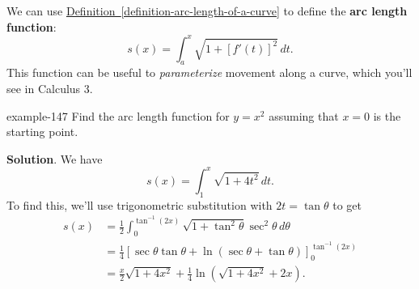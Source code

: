 \documentclass[10pt,]{book}
\newcommand{\terminology}[1]{\textbf{#1}}
\numberwithin{equation}{section}
\newcommand{\amp}{&}
\begin{document}
\par
\hypertarget{p-658}{}%
We can use \hyperref[definition-arc-length-of-a-curve]{Definition~\ref{definition-arc-length-of-a-curve}} to define the \terminology{arc length function}:%
\begin{equation*}
s(x) = \int_{a}^{x}\sqrt{1 + [f'(t)]^{2}}\,dt.
\end{equation*}
This function can be useful to \emph{parameterize} movement along a curve, which you'll see in Calculus 3.%
\begin{example}{}{example-147}%
\hypertarget{p-659}{}%
Find the arc length function for \(y = x^{2}\) assuming that \(x = 0\) is the starting point.%
\par\smallskip%
\noindent\textbf{Solution}.\hypertarget{solution-143}{}\quad%
\hypertarget{p-660}{}%
We have%
\begin{equation*}
s(x) = \int_{1}^{x}\sqrt{1 + 4t^{2}}\,dt.
\end{equation*}
To find this, we'll use trigonometric substitution with \(2t = \tan\theta\) to get%
\begin{align*}
s(x) \amp = \frac{1}{2}\int_{0}^{\tan^{-1}(2x)}\sqrt{1 + \tan^{2}\theta}\sec^{2}\theta\,d\theta \\
\amp = \frac{1}{4}\left[\sec\theta\tan\theta + \ln(\sec\theta + \tan\theta)\right]_{0}^{\tan^{-1}(2x)} \\
\amp = \frac{x}{2}\sqrt{1 + 4x^{2}} + \frac{1}{4}\ln(\sqrt{1 + 4x^{2}} + 2x). 
\end{align*}
%
\end{example}
%
%
\typeout{************************************************}
\typeout{************************************************}
%
\end{document}
